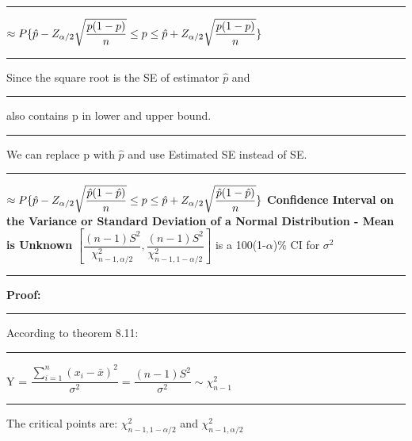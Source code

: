 \documentclass[]{article}
\begin{document}
\newline
\newline
\newline\Large\rule{4.3cm}{0pt} $ \approx  P \{\hat{p} - Z_{\alpha\\/2}\sqrt{\dfrac{p(1-p)}{n}}  \le p \le \hat{p} + Z_{\alpha\\/2}\sqrt{\dfrac{p(1-p)}{n}}   \}$
\newline
\newline\Large\rule{3.0cm}{0pt} Since the square root is the SE of estimator $\hat{p}$ and 
\newline\Large\rule{3.0cm}{0pt} also contains p in lower and upper bound.
\newline\Large\rule{3.0cm}{0pt} We can replace p with $\hat{p}$ and use Estimated SE instead of SE.
\newline
\newline\Large\rule{4.3cm}{0pt} $ \approx  P \{\hat{p} - Z_{\alpha\\/2}\sqrt{\dfrac{\hat{p} (1-\hat{p} )}{n}}  \le p \le \hat{p} + Z_{\alpha\\/2}\sqrt{\dfrac{\hat{p} (1-\hat{p} )}{n}}   \}$
\newline
\newline
\newline
\newline
\newline
\newline
\newline
\Large\textbf{Confidence Interval on the Variance or Standard Deviation of \newline a Normal Distribution - Mean is Unknown}
\newline
\newline
$\left[ \dfrac{(n-1)S^2}{\chi^{2}_{n-1,\alpha/2 }}, \dfrac{(n-1)S^2}{\chi^{2}_{n-1,1-\alpha/2 }} \right] $ is a 100(1-$\alpha$)$\%$ CI for $\sigma^2$ 
\newline 
\newline
\newline\Large\rule{3.0cm}{0pt} \textbf{Proof:}
\newline\Large\rule{3.0cm}{0pt} According to theorem 8.11:
\newline 
\newline\Large\rule{3.0cm}{0pt}  Y = $\dfrac{ \sum_{i=1}^{n} (x_i - \bar{x})^2  }{ \sigma^2 } = \dfrac{(n-1)S^2}{\sigma^2} \sim \chi^{2}_{n-1}$
\newline
\newline\Large\rule{3.0cm}{0pt} The critical points are: $\chi^{2}_{n-1,1-\alpha/2 }$ and $\chi^{2}_{n-1,\alpha/2 }$
\end{document}

